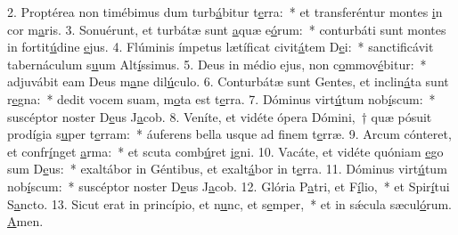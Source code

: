 2. Proptérea non timébimus dum turb\uline{á}bitur t\uline{e}rra:~* et transferéntur montes \uline{i}n cor m\uline{a}ris.
3. Sonuérunt, et turbátæ sunt \uline{a}quæ e\uline{ó}rum:~* conturbáti sunt montes in fortit\uline{ú}dine \uline{e}jus.
4. Flúminis ímpetus lætíficat civit\uline{á}tem D\uline{e}i:~* sanctificávit tabernáculum s\uline{u}um Alt\uline{í}ssimus.
5. Deus in médio ejus, non c\uline{o}mmov\uline{é}bitur:~* adjuvábit eam Deus m\uline{a}ne dil\uline{ú}culo.
6. Conturbátæ sunt Gentes, et inclin\uline{á}ta sunt r\uline{e}gna:~* dedit vocem suam, m\uline{o}ta est t\uline{e}rra.
7. Dóminus virt\uline{ú}tum nob\uline{í}scum:~* suscéptor noster D\uline{e}us J\uline{a}cob.
8. Veníte, et vidéte ópera Dómini,~† quæ pósuit prodígia s\uline{u}per t\uline{e}rram:~* áuferens bella usque ad f\uline{i}nem t\uline{e}rræ.
9. Arcum cónteret, et confr\uline{í}nget \uline{a}rma:~* et scuta comb\uline{ú}ret \uline{i}gni.
10. Vacáte, et vidéte quóniam \uline{e}go sum D\uline{e}us:~* exaltábor in Géntibus, et exalt\uline{á}bor in t\uline{e}rra.
11. Dóminus virt\uline{ú}tum nob\uline{í}scum:~* suscéptor noster D\uline{e}us J\uline{a}cob.
12. Glória P\uline{a}tri, et F\uline{í}lio,~* et Spir\uline{í}tui S\uline{a}ncto.
13. Sicut erat in princípio, et n\uline{u}nc, et s\uline{e}mper,~* et in sǽcula sæcul\uline{ó}rum. \uline{A}men.
